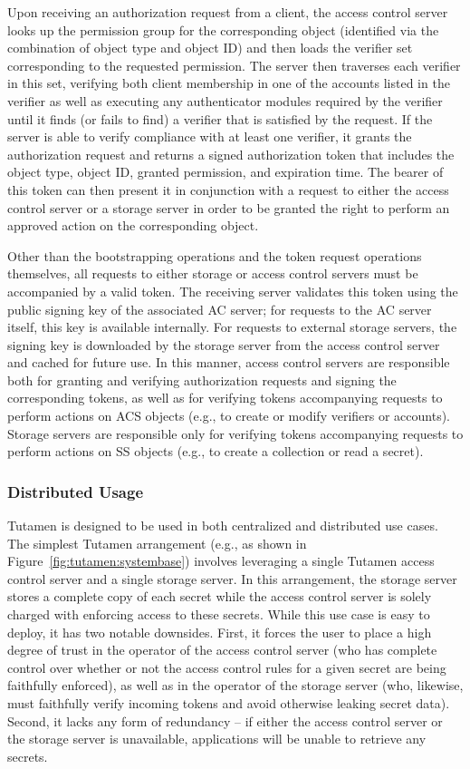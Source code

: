Upon receiving an authorization request from a client, the access
control server looks up the permission group for the corresponding
object (identified via the combination of object type and object ID)
and then loads the verifier set corresponding to the requested
permission. The server then traverses each verifier in this set,
verifying both client membership in one of the accounts listed in the
verifier as well as executing any authenticator modules required by
the verifier until it finds (or fails to find) a verifier that is
satisfied by the request. If the server is able to verify compliance
with at least one verifier, it grants the authorization request and
returns a signed authorization token that includes the object type,
object ID, granted permission, and expiration time. The bearer of this
token can then present it in conjunction with a request to either the
access control server or a storage server in order to be granted the
right to perform an approved action on the corresponding object.

Other than the bootstrapping operations and the token request
operations themselves, all requests to either storage or access
control servers must be accompanied by a valid token. The receiving
server validates this token using the public signing key of the
associated AC server; for requests to the AC server itself, this key
is available internally. For requests to external storage servers, the
signing key is downloaded by the storage server from the access
control server and cached for future use. In this manner, access
control servers are responsible both for granting and verifying
authorization requests and signing the corresponding tokens, as well
as for verifying tokens accompanying requests to perform actions on
ACS objects (e.g., to create or modify verifiers or accounts). Storage
servers are responsible only for verifying tokens accompanying
requests to perform actions on SS objects (e.g., to create a
collection or read a secret).

\subsubsection{Distributed Usage}
\label{sec:tutamen:arch:distributed}

Tutamen is designed to be used in both centralized and distributed use
cases. The simplest Tutamen arrangement (e.g., as shown in
Figure~\ref{fig:tutamen:systembase}) involves leveraging a single
Tutamen access control server and a single storage server. In this
arrangement, the storage server stores a complete copy of each secret
while the access control server is solely charged with enforcing
access to these secrets. While this use case is easy to deploy, it has
two notable downsides. First, it forces the user to place a high
degree of trust in the operator of the access control server (who has
complete control over whether or not the access control rules for a
given secret are being faithfully enforced), as well as in the
operator of the storage server (who, likewise, must faithfully verify
incoming tokens and avoid otherwise leaking secret data). Second, it
lacks any form of redundancy -- if either the access control server or
the storage server is unavailable, applications will be unable to
retrieve any secrets.


